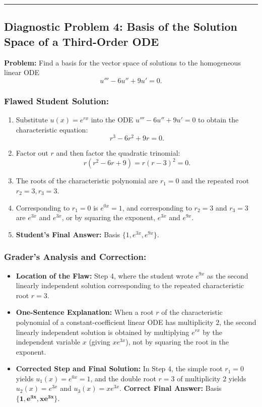 \documentclass[11pt,a4paper]{article}
\begin{document}
\bigskip
\hrule
\bigskip

\subsection*{Diagnostic Problem 4: Basis of the Solution Space of a Third-Order ODE}
\textbf{Problem:} Find a basis for the vector space of solutions to the homogeneous linear ODE
\[
    u''' - 6u'' + 9u' = 0.
\]

\subsubsection*{Flawed Student Solution:}
\begin{enumerate}
    \item Substitute $u(x) = e^{rx}$ into the ODE $u''' - 6u'' + 9u' = 0$ to obtain the characteristic equation:
    \[
        r^3 - 6r^2 + 9r = 0.
    \]
    \item Factor out $r$ and then factor the quadratic trinomial:
    \[
        r(r^2 - 6r + 9) = r(r - 3)^2 = 0.
    \]
    \item The roots of the characteristic polynomial are $r_1 = 0$ and the repeated root $r_2 = 3, r_3 = 3$.
    \item Corresponding to $r_1 = 0$ is $e^{0x} = 1$, and corresponding to $r_2 = 3$ and $r_3 = 3$ are $e^{3x}$ and $e^{3x}$, or by squaring the exponent, $e^{3x}$ and $e^{9x}$.
    \item \textbf{Student's Final Answer:} Basis $\{1, e^{3x}, e^{9x}\}$.
\end{enumerate}

\subsubsection*{Grader's Analysis and Correction:}
\begin{itemize}
    \item \textbf{Location of the Flaw:} Step 4, where the student wrote $e^{9x}$ as the second linearly independent solution corresponding to the repeated characteristic root $r = 3$.
    \item \textbf{One-Sentence Explanation:} When a root $r$ of the characteristic polynomial of a constant-coefficient linear ODE has multiplicity $2$, the second linearly independent solution is obtained by multiplying $e^{rx}$ by the independent variable $x$ (giving $x e^{3x}$), not by squaring the root in the exponent.
    \item \textbf{Corrected Step and Final Solution:}
    In Step 4, the simple root $r_1 = 0$ yields $u_1(x) = e^{0x} = 1$, and the double root $r = 3$ of multiplicity $2$ yields $u_2(x) = e^{3x}$ and $u_3(x) = x e^{3x}$.
    \textbf{Correct Final Answer:} Basis $\mathbf{\{1, e^{3x}, x e^{3x}\}}$.
\end{itemize}
\end{document}
